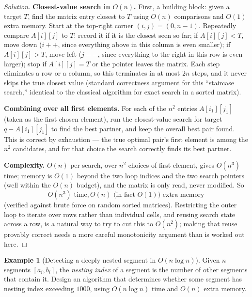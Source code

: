\documentclass[11pt]{article}
\theoremstyle{definition}
\newtheorem{example}{Example}[section]
\begin{document}
\begin{proof}[Solution]
\textbf{Closest-value search in $O(n)$.} First, a building block: given a target $T$, find the matrix entry closest to $T$ using $O(n)$ comparisons and $O(1)$ extra memory. Start at the top-right corner $(i,j)=(0,n-1)$. Repeatedly compare $A[i][j]$ to $T$: record it if it is the closest seen so far; if $A[i][j]<T$, move down ($i{+}{+}$, since everything above in this column is even smaller); if $A[i][j]>T$, move left ($j{-}{-}$, since everything to the right in this row is even larger); stop if $A[i][j]=T$ or the pointer leaves the matrix. Each step eliminates a row or a column, so this terminates in at most $2n$ steps, and it never skips the true closest value (standard correctness argument for this ``staircase search,'' identical to the classical algorithm for exact search in a sorted matrix).

\textbf{Combining over all first elements.} For each of the $n^2$ entries $A[i_1][j_1]$ (taken as the first chosen element), run the closest-value search for target $q-A[i_1][j_1]$ to find the best partner, and keep the overall best pair found. This is correct by exhaustion — the true optimal pair's first element is among the $n^2$ candidates, and for that choice the search correctly finds its best partner.

\textbf{Complexity.} $O(n)$ per search, over $n^2$ choices of first element, gives $O(n^3)$ time; memory is $O(1)$ beyond the two loop indices and the two search pointers (well within the $O(n)$ budget), and the matrix is only read, never modified. So
\[
\boxed{O(n^3)\text{ time}, O(n)\text{ (in fact }O(1)\text{) extra memory}}
\]
(verified against brute force on random sorted matrices). Restricting the outer loop to iterate over rows rather than individual cells, and reusing search state across a row, is a natural way to try to cut this to $O(n^2)$; making that reuse provably correct needs a more careful monotonicity argument than is worked out here.
\end{proof}

\begin{example}[Detecting a deeply nested segment in $O(n\log n)$]
Given $n$ segments $[a_i,b_i]$, the \emph{nesting index} of a segment is the number of other segments that contain it. Design an algorithm that determines whether some segment has nesting index exceeding $1000$, using $O(n\log n)$ time and $O(n)$ extra memory.
\end{example}
\end{document}
